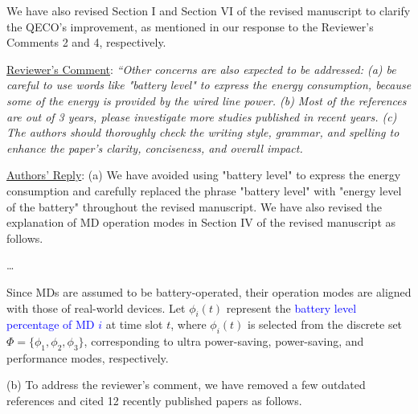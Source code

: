 \documentclass[12pt,draftclsnofoot,onecolumn]{IEEEtran}
\newcommand{\rev}[1]{{\color{blue}#1}} %
\newcommand{\rev}[1]{#1}
\newenvironment{my}[2]%
{\begin{list}{}%
{\setlength{\rightmargin}{#1}\setlength{\leftmargin}{#2}}%


 \item[]{}

} {\end{list}}
\begin{document}
\begin{enumerate}
\begin{my}{1cm}{1cm}
	


\end{my}\vspace{6mm}

We have also revised Section I and Section VI of the revised manuscript to clarify the QECO's improvement, as mentioned in our response to the Reviewer's Comments 2 and 4, respectively.








\vspace{5mm}

\item \underline{Reviewer's Comment}: 
\textit{``Other concerns are also expected to be addressed: (a) be careful to use words like "battery level" to express the energy consumption, because some of the energy is provided by the wired line power. (b) Most of the references are out of 3 years, please investigate more studies published in recent years. (c) The authors should thoroughly check the writing style, grammar, and spelling to enhance the paper's clarity, conciseness, and overall impact.}\newline

\underline{Authors' Reply}: (a) We have avoided using "battery level" to express the energy consumption and carefully replaced the phrase "battery level" with "energy level of the battery" throughout the revised manuscript. We have also revised the explanation of MD operation modes in Section IV of the revised manuscript as follows. 

		\begin{my}{1cm}{1cm}
	\rev{
		
		\dots
		
Since MDs are assumed to be battery-operated, their operation modes are aligned with those of real-world devices. Let $\phi_i(t)$ represent the \textcolor{blue}{battery level percentage of MD $i$} at time slot $t$, where $\phi_i(t)$ is selected from the discrete set $\Phi = \{\phi_1, \phi_2, \phi_3\}$, corresponding to ultra power-saving, power-saving, and performance modes, respectively.
}
\end{my}\vspace{6mm}

(b) To address the reviewer’s comment, we have removed a few outdated references and cited 12 recently published papers as follows. \newline


\end{enumerate}
\end{document}
